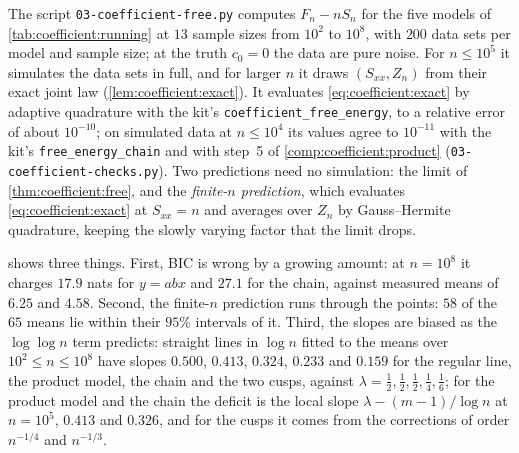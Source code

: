 \begin{refsection}
The script \texttt{03-coefficient-free.py} computes $F_n-nS_n$ for the five models of \cref{tab:coefficient:running} at $13$ sample sizes from $10^2$ to $10^8$, with $200$ data sets per model and sample size; at the truth $c_0=0$ the data are pure noise. For $n\le10^5$ it simulates the data sets in full, and for larger $n$ it draws $(S_{xx},Z_n)$ from their exact joint law (\cref{lem:coefficient:exact}). It evaluates \eqref{eq:coefficient:exact} by adaptive quadrature with the kit's \texttt{coefficient\_free\_energy}, to a relative error of about $10^{-10}$; on simulated data at $n\le10^4$ its values agree to $10^{-11}$ with the kit's \texttt{free\_energy\_chain} and with step~5 of \cref{comp:coefficient:product} (\texttt{03-coefficient-checks.py}). Two predictions need no simulation: the limit of \cref{thm:coefficient:free}, and the \emph{finite-$n$ prediction}, which evaluates \eqref{eq:coefficient:exact} at $S_{xx}=n$ and averages over $Z_n$ by Gauss--Hermite quadrature, keeping the slowly varying factor that the limit drops.

 shows three things. First, BIC is wrong by a growing amount: at $n=10^8$ it charges $17.9$ nats for $y=abx$ and $27.1$ for the chain, against measured means of $6.25$ and $4.58$. Second, the finite-$n$ prediction runs through the points: $58$ of the $65$ means lie within their $95\%$ intervals of it. Third, the slopes are biased as the $\log\log n$ term predicts: straight lines in $\log n$ fitted to the means over $10^2\le n\le10^8$ have slopes $0.500$, $0.413$, $0.324$, $0.233$ and $0.159$ for the regular line, the product model, the chain and the two cusps, against $\lambda=\frac12,\frac12,\frac12,\frac14,\frac16$; for the product model and the chain the deficit is the local slope $\lambda-(m-1)/\log n$ at $n=10^5$, $0.413$ and $0.326$, and for the cusps it comes from the corrections of order $n^{-1/4}$ and $n^{-1/3}$.


\end{refsection}
